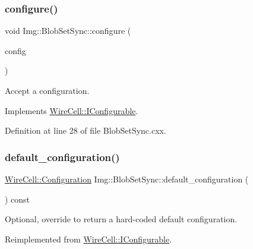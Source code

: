 \subsubsection{\texorpdfstring{configure()}{configure()}}
{\footnotesize\ttfamily void Img\+::\+Blob\+Set\+Sync\+::configure (\begin{DoxyParamCaption}\item[{const \hyperlink{namespace_wire_cell_a9f705541fc1d46c608b3d32c182333ee}{Wire\+Cell\+::\+Configuration} \&}]{config }\end{DoxyParamCaption})\hspace{0.3cm}{\ttfamily [virtual]}}



Accept a configuration. 



Implements \hyperlink{class_wire_cell_1_1_i_configurable_a57ff687923a724093df3de59c6ff237d}{Wire\+Cell\+::\+I\+Configurable}.



Definition at line 28 of file Blob\+Set\+Sync.\+cxx.

\mbox{\label{class_wire_cell_1_1_img_1_1_blob_set_sync_a2a1fa199a9e012d6bee50061f2381609}} 
\subsubsection{\texorpdfstring{default\+\_\+configuration()}{default\_configuration()}}
{\footnotesize\ttfamily \hyperlink{namespace_wire_cell_a9f705541fc1d46c608b3d32c182333ee}{Wire\+Cell\+::\+Configuration} Img\+::\+Blob\+Set\+Sync\+::default\+\_\+configuration (\begin{DoxyParamCaption}{ }\end{DoxyParamCaption}) const\hspace{0.3cm}{\ttfamily [virtual]}}



Optional, override to return a hard-\/coded default configuration. 



Reimplemented from \hyperlink{class_wire_cell_1_1_i_configurable_a54841b2da3d1ea02189478bff96f7998}{Wire\+Cell\+::\+I\+Configurable}.



